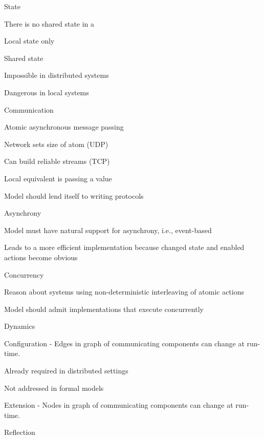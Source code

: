 \documentclass[letterpaper]{article}
\begin{document}
\begin{outline}
\item State
  \begin{outline}
  \item There is no shared state in a 
  \item Local state only
  \item Shared state
    \begin{outline}
      \item Impossible in distributed systems
      \item Dangerous in local systems
    \end{outline}
  \end{outline}
\item Communication
  \begin{outline}
  \item Atomic asynchronous message passing
  \item Network sets size of atom (UDP)
  \item Can build reliable streams (TCP)
  \item Local equivalent is passing a value
  \item Model should lend itself to writing protocols
  \end{outline}
\item Asynchrony
  \begin{outline}
    \item Model must have natural support for asynchrony, i.e., event-based
    \item Leads to a more efficient implementation because changed state and enabled actions become obvious
  \end{outline}
\item Concurrency
  \begin{outline}
    \item Reason about systems using non-deterministic interleaving of atomic actions
    \item Model should admit implementations that execute concurrently
  \end{outline}
\item Dynamics
  \begin{outline}
    \item Configuration - Edges in graph of communicating components can change at run-time.
      \begin{outline}
      \item Already required in distributed settings
      \item Not addressed in formal models
      \end{outline}
    \item Extension - Nodes in graph of communicating components can change at run-time.
  \end{outline}
  \item Reflection
\end{outline}
\end{document}
